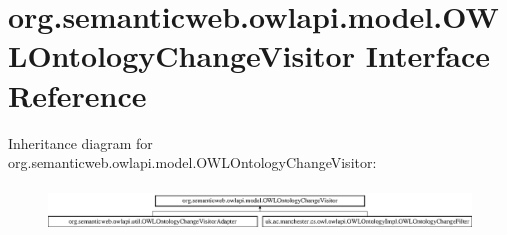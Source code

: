 \hypertarget{interfaceorg_1_1semanticweb_1_1owlapi_1_1model_1_1_o_w_l_ontology_change_visitor}{\section{org.\-semanticweb.\-owlapi.\-model.\-O\-W\-L\-Ontology\-Change\-Visitor Interface Reference}
\label{interfaceorg_1_1semanticweb_1_1owlapi_1_1model_1_1_o_w_l_ontology_change_visitor}
}
Inheritance diagram for org.\-semanticweb.\-owlapi.\-model.\-O\-W\-L\-Ontology\-Change\-Visitor\-:\begin{figure}[H]
\begin{center}
\leavevmode
\includegraphics[height=1.214751cm]{interfaceorg_1_1semanticweb_1_1owlapi_1_1model_1_1_o_w_l_ontology_change_visitor}
\end{center}
\end{figure}
